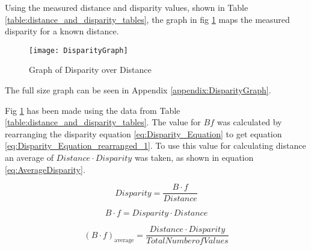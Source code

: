 \documentclass[conference]{IEEEtran}
\begin{document}
Using the measured distance and disparity values, shown in Table \ref{table:distance_and_disparity_tables}, the graph in fig \ref{fig:DisparityGraph} maps the measured disparity for a known distance.

\begin{figure}[H]
\centerline{\texttt{[image: DisparityGraph]}}
\caption{Graph of Disparity over Distance }
\label{fig:DisparityGraph}
\end{figure} 

The full size graph can be seen in Appendix \ref{appendix:DisparityGraph}.

Fig \ref{fig:DisparityGraph} has been made using the data from Table \ref{table:distance_and_disparity_tables}. The value for $Bf$ was calculated by rearranging the disparity equation \ref{eq:Disparity_Equation} to get equation \ref{eq:Disparity_Equation_rearranged_1}. To use this value for calculating distance an average of $Distance \cdot Disparity$ was taken, as shown in equation \ref{eq:AverageDisparity}. 

\begin{equation} \label{eq:Disparity_Equation}
Disparity = \frac{B \cdot f}{Distance}
\end{equation}

\begin{equation} \label{eq:Disparity_Equation_rearranged_1}
B \cdot f = Disparity \cdot Distance
\end{equation}

\begin{equation} \label{eq:AverageDisparity}
(B \cdot f)_\textrm{average} = \frac{Distance \cdot Disparity}{Total Number of Values}
\end{equation}
\end{document}
